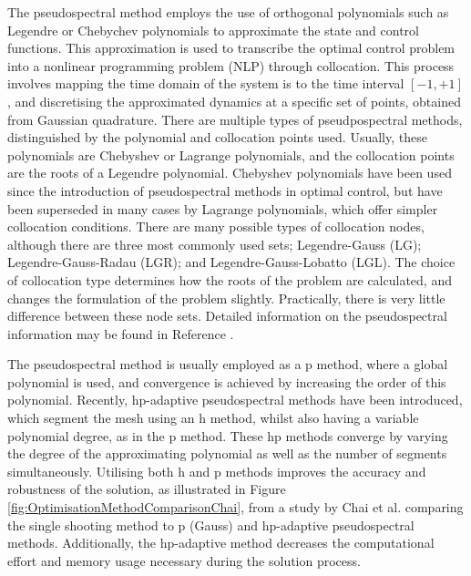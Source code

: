  The pseudospectral method employs the use of orthogonal polynomials such as Legendre or Chebychev polynomials to approximate the state and control functions.
This approximation is used to transcribe the optimal control problem into a nonlinear programming problem (NLP) through collocation. This process involves mapping the time domain of the system is to the time interval $[-1,+1]$, and discretising the approximated dynamics at a specific set of points, obtained from Gaussian quadrature\cite{Fahroo2000,Huntington2007,Kelly2015,Rao2009,Garg2011}. 
 There are multiple types of pseudpospectral methods, distinguished by the polynomial and collocation points used. Usually, these polynomials are Chebyshev or Lagrange polynomials\cite{Fahroo2000,Rao2009}, and the collocation points are the roots of a Legendre polynomial\cite{Garg2009}. Chebyshev polynomials have been used since the introduction of pseudospectral methods in optimal control, but have been superseded in many cases by Lagrange polynomials, which offer simpler collocation conditions\cite{Rao2009}. 
 There are many possible types of collocation nodes, although there are three most commonly used sets; Legendre-Gauss (LG); Legendre-Gauss-Radau (LGR); and Legendre-Gauss-Lobatto (LGL)\cite{Garg2009,Rao2009}. The choice of collocation type determines how the roots of the problem are calculated, and changes the formulation of the problem slightly\cite{Garg2009}. Practically, there is very little difference between these node sets\cite{Garg2009}.
 Detailed information on the pseudospectral information may be found in Reference \cite{Huntington2007}.
 
 
 The pseudospectral method is usually employed as a \textsf{p} method, where a global polynomial is used, and convergence is achieved by increasing the order of this polynomial\cite{Rao2009}. Recently, \textsf{hp}-adaptive pseudospectral methods have been introduced, which segment the mesh using an h method, whilst also having a variable polynomial degree, as in the \textsf{p} method\cite{Darby2011a}. These \textsf{hp} methods converge by varying the degree of the approximating polynomial as well as the number of segments simultaneously. Utilising both \textsf{h} and \textsf{p} methods improves the accuracy and robustness of the solution, as illustrated in Figure \ref{fig:OptimisationMethodComparisonChai}, from a study by Chai et al.\cite{Chai2015} comparing the single shooting method to \textsf{p} (Gauss) and \textsf{hp}-adaptive pseudospectral methods. Additionally, the \textsf{hp}-adaptive method decreases the computational effort and memory usage necessary during the solution process\cite{Darby2011a,Chai2015}. 


